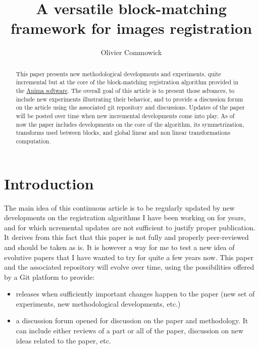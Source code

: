 \documentclass[a4paper]{article}
\title{A versatile block-matching framework for images registration}
\author{Olivier Commowick}
\begin{document}
\maketitle

\begin{abstract}
This paper presents new methodological developments and experiments, quite incremental but at the core of the block-matching registration algorithm provided in the \href{https://anima.irisa.fr}{Anima software}. The overall goal of this article is to present those advances, to include new experiments illustrating their behavior, and to provide a discussion forum on the article using the associated git repository and discussions. Updates of the paper will be posted over time when new incremental developments come into play. As of now the paper includes developments on the core of the algorithm, its symmetrization, transforms used between blocks, and global linear and non linear transformations computation.
\end{abstract}

\tableofcontents

\newpage

\section{Introduction}

The main idea of this continuous article is to be regularly updated by new developments on the registration algorithms I have been working on for years, and for which ncremental updates are not sufficient to justify proper publication. It derives from this fact that this paper is not fully and properly peer-reviewed and should be taken as is. It is however a way for me to test a new idea of evolutive papers that I have wanted to try for quite a few years now. This paper and the associated repository will evolve over time, using the possibilities offered by a Git platform to provide:

\begin{itemize}
\item releases when sufficiently important changes happen to the paper (new set of experiments, new methodological developments, etc.)
\item a discussion forum opened for discussion on the paper and methodology. It can include either reviews of a part or all of the paper, discussion on new ideas related to the paper, etc.
\end{itemize}
\end{document}
